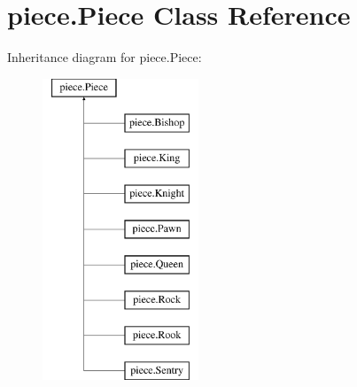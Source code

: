 \hypertarget{classpiece_1_1Piece}{\section{piece.\-Piece Class Reference}
\label{classpiece_1_1Piece}
}
Inheritance diagram for piece.\-Piece\-:\begin{figure}[H]
\begin{center}
\leavevmode
\includegraphics[height=9.000000cm]{classpiece_1_1Piece}
\end{center}
\end{figure}
